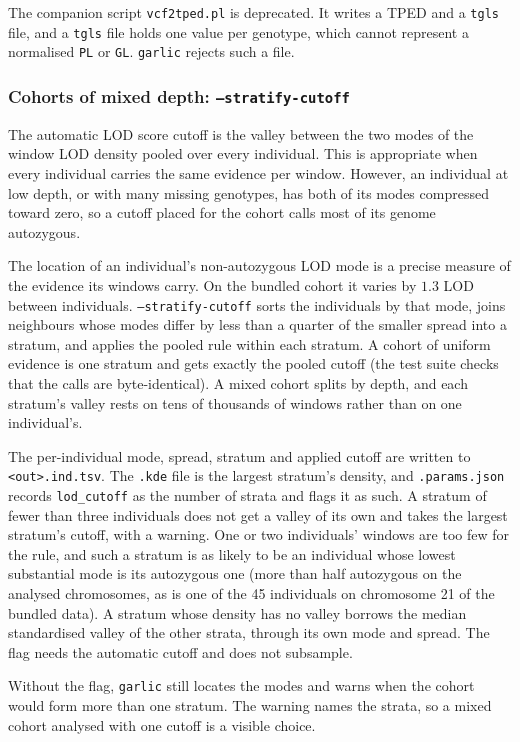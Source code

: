 \documentclass[12pt]{article}%
\begin{document}
The companion script {\tt vcf2tped.pl} is deprecated.  It writes a TPED and a {\tt tgls} file, and a {\tt tgls} file holds one value per genotype, which cannot represent a normalised {\tt PL} or {\tt GL}.  {\tt garlic} rejects such a file.
\subsubsection{Cohorts of mixed depth: {\tt --stratify-cutoff}}
\label{sec:stratify}

The automatic LOD score cutoff is the valley between the two modes of the window LOD density pooled over every individual.  This is appropriate when every individual carries the same evidence per window.  However, an individual at low depth, or with many missing genotypes, has both of its modes compressed toward zero, so a cutoff placed for the cohort calls most of its genome autozygous.

The location of an individual's non-autozygous LOD mode is a precise measure of the evidence its windows carry.  On the bundled cohort it varies by $1.3$ LOD between individuals.  {\tt --stratify-cutoff} sorts the individuals by that mode, joins neighbours whose modes differ by less than a quarter of the smaller spread into a stratum, and applies the pooled rule within each stratum.  A cohort of uniform evidence is one stratum and gets exactly the pooled cutoff (the test suite checks that the calls are byte-identical).  A mixed cohort splits by depth, and each stratum's valley rests on tens of thousands of windows rather than on one individual's.

The per-individual mode, spread, stratum and applied cutoff are written to {\tt <out>.ind.tsv}.  The {\tt .kde} file is the largest stratum's density, and {\tt .params.json} records {\tt lod\_cutoff} as the number of strata and flags it as such.  A stratum of fewer than three individuals does not get a valley of its own and takes the largest stratum's cutoff, with a warning.  One or two individuals' windows are too few for the rule, and such a stratum is as likely to be an individual whose lowest substantial mode is its autozygous one (more than half autozygous on the analysed chromosomes, as is one of the 45 individuals on chromosome 21 of the bundled data).  A stratum whose density has no valley borrows the median standardised valley of the other strata, through its own mode and spread.  The flag needs the automatic cutoff and does not subsample.

Without the flag, {\tt garlic} still locates the modes and warns when the cohort would form more than one stratum.  The warning names the strata, so a mixed cohort analysed with one cutoff is a visible choice.
\end{document}
